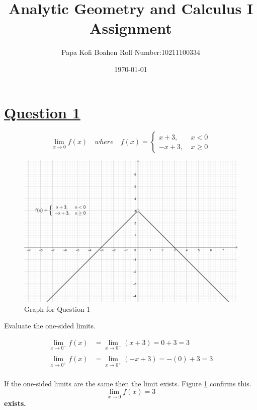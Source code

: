 \documentclass[16pt]{article}
\title{\huge{Analytic Geometry and Calculus I Assignment}}
\author{\huge{Papa Kofi Boahen Roll Number:10211100334}}
\date{\today}
\begin{document}
	\maketitle
\section*{\underline{Question 1}}
\begin{huge}
	\[ \lim_{x \to 0}f(x) \quad where \quad f(x) = \begin{cases} 
		x + 3, \ & x < 0 \\
		-x + 3, \ & x \geq 0 
	\end{cases}
	\]
\end{huge}	

\begin{figure}[h]
	\includegraphics[width=\textwidth]{Graph1.jpg}
	\caption{Graph for Question 1}
	\label{graph1}
\end{figure}

\vspace{1cm}

\huge{Evaluate the one-sided limits.}

\begin{align*}
	\lim_{x\to0^-} f(x) & = \lim_{x\to0^-} (x+3) = 0 + 3 = 3 \\
	&
	\\
	\lim_{x\to0^+} f(x) & =  \lim_{x\to0^+} (-x+3) = -(0) + 3 = 3
\end{align*}
\\
If the one-sided limits are the same then the limit exists. Figure \ref{graph1} confirms this. \\
  \[ \lim_{x \to 0} f(x) = 3 \] \textbf{exists.}
\end{document}
